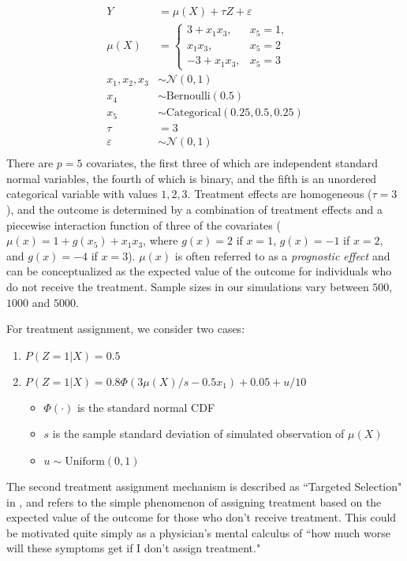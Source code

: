 \documentclass[aos]{imsart}
\begin{document}
\begin{align*}
Y &= \mu(X) + \tau Z + \varepsilon\\
\mu(X) &= 
\begin{cases}
3 + x_1 x_3,&  x_5 = 1,\\
x_1 x_3,&  x_5 = 2\\
-3 + x_1 x_3,&  x_5 = 3
\end{cases} \\
x_1, x_2, x_3 &\sim \mathcal{N}(0, 1)\\
x_4 &\sim \textrm{Bernoulli}(0.5)\\
x_5 &\sim \textrm{Categorical}(0.25, 0.5, 0.25)\\
\tau &= 3\\
\varepsilon &\sim \mathcal{N}(0, 1)\\
\end{align*}
There are $p = 5$ covariates, the first three of which are independent standard normal variables, the fourth of which is binary, 
and the fifth is an unordered categorical variable with values $1, 2, 3$. Treatment effects are homogeneous ($\tau = 3$), and 
the outcome is determined by a combination of treatment effects and a piecewise interaction function of three of the covariates
($\mu(x) = 1 + g(x_5) + x_1 x_3$, where $g(x) = 2$ if $x = 1$, $g(x) = -1$ if $x = 2$, and $g(x) = -4$ if $x = 3$). 
$\mu(x)$ is often referred to as a \textit{prognostic effect} and can be conceptualized as the expected value of 
the outcome for individuals who do not receive the treatment.
Sample sizes in our simulations vary between $500$, $1000$ and $5000$. 

For treatment assignment, we consider two cases:

\begin{enumerate}
\item $P(Z = 1 | X) = 0.5$
\item $P(Z = 1 | X) = 0.8\Phi(3 \mu(X) / s - 0.5 x_1) + 0.05 + u / 10$
\begin{itemize}
	\item $\Phi(\cdot)$ is the standard normal CDF
	\item $s$ is the sample standard deviation of simulated observation of $\mu(X)$
	\item $u \sim \mathrm{Uniform}(0, 1)$ 
\end{itemize}
\end{enumerate}

The second treatment assignment mechanism is described as ``Targeted Selection" in \cite{hahn2020bayesian}, and 
refers to the simple phenomenon of assigning treatment based on the expected value of the outcome for those who don't receive 
treatment. This could be motivated quite simply as a physician's mental calculus of ``how much worse will these symptoms get if I don't 
assign treatment."
\end{document}
